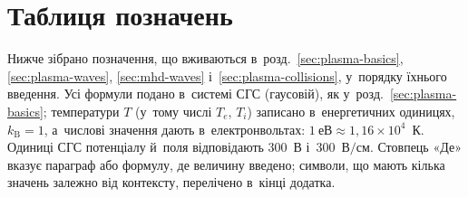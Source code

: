 

\section{Таблиця позначень}\label{sec:notation}\hypertarget{app-notation}{}

Нижче зібрано позначення, що вживаються в~розд.~\ref{sec:plasma-basics}, \ref{sec:plasma-waves}, \ref{sec:mhd-waves} і~\ref{sec:plasma-collisions}, у~порядку
їхнього введення. Усі формули подано в~системі СГС (гаусовій), як у~розд.~\ref{sec:plasma-basics}; температури $T$
(у~тому числі $T_e$, $T_i$) записано в~енергетичних одиницях, $k_{\mathrm B}=1$, а~числові значення дають
в~електронвольтах: $1~\text{еВ}\approx1{,}16\times10^{4}$~К. Одиниці СГС потенціалу й~поля відповідають
$300$~В і~$300$~В$/$см. Стовпець «Де» вказує
параграф або формулу, де величину введено; символи, що мають кілька значень залежно від контексту,
перелічено в~кінці додатка.

